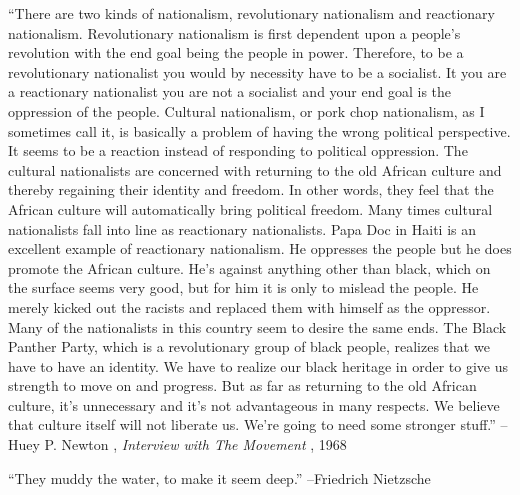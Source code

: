 \documentclass{article}%
\begin{document}
\begin{minipage}{\textwidth}%
\flushleft%
“There are two kinds of nationalism, revolutionary nationalism and reactionary  nationalism. Revolutionary nationalism is first dependent upon a people’s revolution with the end goal being the people in power. Therefore, to be a revolutionary nationalist you would by necessity have to be a socialist. It you are a reactionary nationalist you are not a socialist and your end goal is the oppression of the people. Cultural nationalism, or pork chop nationalism, as I sometimes call it, is basically a problem of having the wrong political perspective. It seems to be a reaction instead of responding to political oppression. The cultural nationalists are concerned with returning to the old African culture and thereby regaining their identity and freedom. In other words, they feel that the African culture will automatically bring political freedom. Many times cultural nationalists fall into line as reactionary nationalists. Papa Doc in Haiti is an excellent example of reactionary nationalism. He oppresses the people but he does promote the African culture. He’s against anything other than black, which on the surface seems very good, but for him it is only to mislead the people. He merely kicked out the racists and replaced them with himself as the oppressor. Many of the nationalists in this country seem to desire the same ends. The Black Panther Party, which is a revolutionary group of black people, realizes that we have to have an identity. We have to realize our black heritage in order to give us strength to move on and progress. But as far as returning to the old African culture, it’s unnecessary and it’s not advantageous in many respects. We believe that culture itself will not liberate us. We’re going to need some stronger stuff.”%
\linebreak%
\vspace{1mm}%
–Huey P. Newton%
, \textit{Interview with The Movement}%
, 1968%
\linebreak%
\vspace{1mm}%
\end{minipage}%
\linebreak%
\vspace{1mm}%
\begin{minipage}{\textwidth}%
\flushleft%
“They muddy the water, to make it seem deep.”%
\linebreak%
\vspace{1mm}%
–Friedrich Nietzsche%
\linebreak%
\vspace{1mm}%
\end{minipage}%
\end{document}
